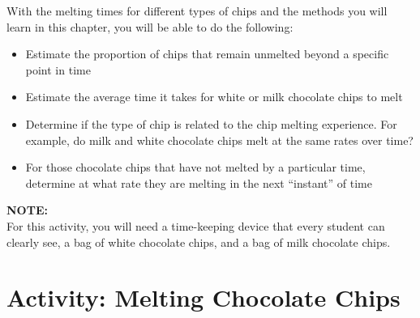 \documentclass[
]{report}
\providecommand{\tightlist}{%
  \setlength{\itemsep}{0pt}\setlength{\parskip}{0pt}}
\begin{document}
With the melting times for different types of chips and the methods you will learn in this chapter, you will be able to do the following:

\begin{itemize}
\tightlist
\item
  Estimate the proportion of chips that remain unmelted beyond a specific point in time\\
\item
  Estimate the average time it takes for white or milk chocolate chips to melt\\
\item
  Determine if the type of chip is related to the chip melting experience. For example, do milk and white chocolate chips melt at the same rates over time?\\
\item
  For those chocolate chips that have not melted by a particular time, determine at what rate they are melting in the next ``instant'' of time
\end{itemize}

\large

\textbf{NOTE:}\\
For this activity, you will need a time-keeping device that every student can clearly see, a bag of white chocolate chips, and a bag of milk chocolate chips.\\
\normalsize

\section*{Activity: Melting Chocolate Chips}\label{activity-melting-chocolate-chips}
\end{document}
